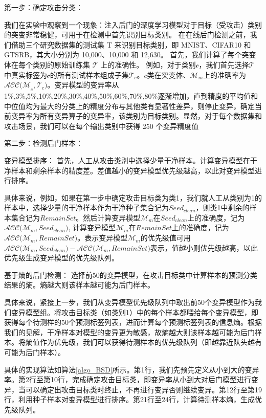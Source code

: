 \documentclass[fontset=macnew,UTF8]{article} %
\begin{document}
第一步：确定攻击分类：

我们在实验中观察到一个现象：注入后门的深度学习模型对于目标（受攻击）类别的突变非常稳健，可用于在检测中首先识别目标类别。 在在线后门检测之前，我们借助三个研究数据集的测试集 T 来识别目标类别，即 MNIST、CIFAR10 和 GTSRB，其大小分别为 10,000、10,000 和 12,630。
首先，我们计算了每个突变体在每个类别的原始训练集 $\mathcal{T}$ 上的准确性。 例如，对于类别$\mathcal{c}$，我们首先选择$\mathcal{T}$ 中真实标签为$\mathcal{c}$的所有测试样本组成子集$\mathcal{T}_c$。$c$类在突变体、$\mathcal{M}_m$上的准确率为$\mathcal{ACC(M}_c,\mathcal{T}_c)$。变异模型的变异率从1\%,3\%,5\%,10\%,20\%,30\%,40\%,50\%,60\%,70\%,80\%逐渐增加，直到精度的平均值和中位值均为最大的分类上的精度分布与其他类有显著性差异，则停止变异，确定当前变异率为所有变异算子的变异率，该类别为目标类别。显然，对于每个数据集和攻击场景，我们可以在每个输出类别中获得 250 个变异精度值

第二步：检测后门样本：

变异模型排序：
首先，人工从攻击类别中选择少量干净样本。计算变异模型在干净样本和剩余样本的精度差。差值越小的变异模型优先级越高，以此对变异模型进行排序。

具体来说，例如，如果在第一步中确定攻击目标类为类1，我们就人工从类别为1的样本中，选择少量的干净样本作为干净种子集合记为$Seed_{clean}$，则类1中剩余的样本集合记为$RemainSet$。然后计算变异模型$\mathcal{M}_m$在$Seed_{clean}$上的准确度，记为$\mathcal{ACC(}\mathcal{M}_m, Seed_{clean}\mathcal{)}$,  计算变异模型$\mathcal{M}_m$在$RemainSet$上的准确度，记为$\mathcal{ACC(}\mathcal{M}_m, RemainSet\mathcal{)}$。表示变异模型$\mathcal{M}_m$的优先级值可用$\mathcal{ACC(}\mathcal{M}_m,Seed_{clean}\mathcal{)}-\mathcal{ACC(}\mathcal{M}_m,RemainSet\mathcal{)}$表示，值越小则优先级越高，以此优先级生成变异模型的优先级队列。

基于熵的后门检测：
选择前50的变异模型，在攻击目标类中计算样本的预测分类结果的熵。熵越大则该样本越可能为后门样本。

具体来说，紧接上一步，我们从变异模型优先级队列中取出前50个变异模型作为我们变异模型组。将攻击目标类（如类别1）中的每个样本都喂给每个变异模型，即获得每个待测样的50个预测标签列表，进而计算每个预测标签列表的信息熵。根据我们的见解，干净样本对模型的变异更为敏感，故熵越大则该样本越可能为后门样本。将熵值作为优先级，我们可以获得待测样本的优先级队列（即越靠近队头越有可能为后门样本）。

具体的实现算法如算法\ref{algo_BSD}所示。第1行，我们先预先定义从小到大的变异率。第2行至第10行，完成确定攻击目标类，即变异率从小到大对后门模型进行变异，当可以确定出攻击目标类时终止，不再进行变异否则继续变异。第12行至第19行，利用种子样本对变异模型进行排序。第21行至24行，计算待测样本熵，生成优先级队列。
\end{document}
